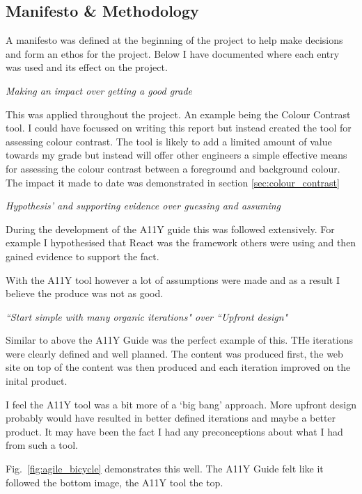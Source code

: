 \subsection{Manifesto \& Methodology}
A manifesto was defined at the beginning of the project to help make
decisions and form an ethos for the project. Below I have documented where
each entry was used and its effect on the project.

\begin{center}
\textit{Making an impact over getting a good grade}
\end{center}
This was applied throughout the project. An example being the Colour Contrast
tool. I could have focussed on writing this report but instead created the
tool for assessing colour contrast. The tool is likely to add a limited amount
of value towards my grade but instead will offer other engineers a simple
effective means for assessing the colour contrast between a foreground and
background colour. The impact it made to date was demonstrated in
section \ref{sec:colour_contrast}

\begin{center}
\textit{Hypothesis’ and supporting evidence over guessing and assuming}
\end{center}
During the development of the A11Y guide this was followed extensively. For
example I hypothesised that React was the framework others were using and
then gained evidence to support the fact.

With the A11Y tool however a lot of assumptions were made and as a result I
believe the produce was not as good.

\begin{center}
\textit{``Start simple with many organic iterations" over ``Upfront design"}
\end{center}
Similar to above the A11Y Guide was the perfect example of this. THe
iterations were clearly defined and well planned. The content was produced
first, the web site on top of the content was then produced and each
iteration improved on the inital product.

I feel the A11Y tool was a bit more of a `big bang' approach. More upfront
design probably would have resulted in better defined iterations and maybe a
better product. It may have been the fact I had any preconceptions about what
I had from such a tool.

Fig.~\ref{fig:agile_bicycle} demonstrates this well. The A11Y Guide felt like
it followed the bottom image, the A11Y tool the top.

